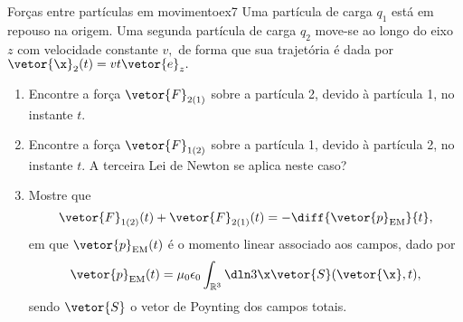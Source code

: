 \begin{exercício}{Forças entre partículas em movimento}{ex7}
   Uma partícula de carga \(q_1\) está em repouso na origem. Uma segunda partícula de carga \(q_2\) move-se ao longo do eixo \(z\) com velocidade constante \(v,\) de forma que sua trajetória é dada por \(\vetor{\x}_2(t) = vt \vetor{e}_z.\)
   \begin{enumerate}[label=(\alph*)]
      \item Encontre a força \(\vetor{F}_{2(1)}\) sobre a partícula 2, devido à partícula 1, no instante \(t\).
      \item Encontre a força \(\vetor{F}_{1(2)}\) sobre a partícula 1, devido à partícula 2, no instante \(t\). A terceira Lei de Newton se aplica neste caso?
      \item Mostre que 
         \begin{equation*}
            \vetor{F}_{1(2)}(t) + \vetor{F}_{2(1)}(t) = -\diff{\vetor{p}_\mathrm{EM}}{t},
         \end{equation*}
         em que \(\vetor{p}_{\mathrm{EM}}(t)\) é o momento linear associado aos campos, dado por
         \begin{equation*}
            \vetor{p}_{\mathrm{EM}}(t) = \mu_0 \epsilon_0 \int_{\mathbb{R}^3} \dln3{\x} \vetor{S}(\vetor{\x}, t),
         \end{equation*}
         sendo \(\vetor{S}\) o vetor de Poynting dos campos totais.
   \end{enumerate}
\end{exercício}
